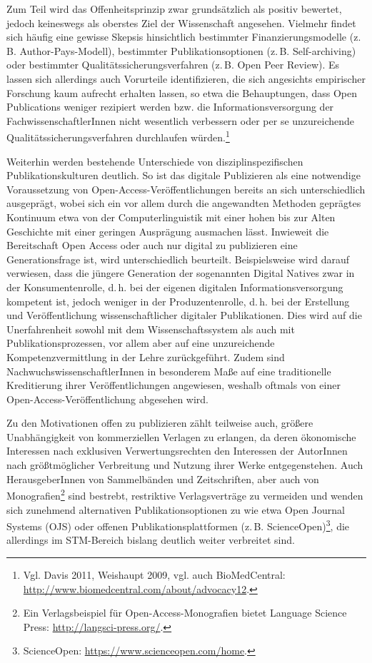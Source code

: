 \documentclass[a4paper,
fontsize=11pt,
oneside,
numbers=noperiodatend,
parskip=half-,
bibliography=totoc,
final
]{scrartcl}
\begin{document}
Zum Teil wird das Offenheitsprinzip zwar grundsätzlich als positiv
bewertet, jedoch keineswegs als oberstes Ziel der Wissenschaft
angesehen. Vielmehr findet sich häufig eine gewisse Skepsis hinsichtlich
bestimmter Finanzierungsmodelle (z.\,B. Author-Pays-Modell), bestimmter
Publikationsoptionen (z.\,B. Self-archiving) oder bestimmter
Qualitätssicherungsverfahren (z.\,B. Open Peer Review). Es lassen sich
allerdings auch Vorurteile identifizieren, die sich angesichts
empirischer Forschung kaum aufrecht erhalten lassen, so etwa die
Behauptungen, dass Open Publications weniger rezipiert werden bzw. die
Informationsversorgung der FachwissenschaftlerInnen nicht wesentlich
verbessern oder per se unzureichende Qualitätssicherungsverfahren
durchlaufen würden.\footnote{Vgl. Davis 2011, Weishaupt 2009, vgl. auch
  BioMedCentral: \url{http://www.biomedcentral.com/about/advocacy12}.}

Weiterhin werden bestehende Unterschiede von disziplinspezifischen
Publikationskulturen deutlich. So ist das digitale Publizieren als eine
notwendige Voraussetzung von Open-Access-Ver\-öffentlichungen bereits an
sich unterschiedlich ausgeprägt, wobei sich ein vor allem durch die
angewandten Methoden geprägtes Kontinuum etwa von der Computerlinguistik
mit einer hohen bis zur Alten Geschichte mit einer geringen Ausprägung
ausmachen lässt. Inwieweit die Bereitschaft Open Access oder auch nur
digital zu publizieren eine Generationsfrage ist, wird unterschiedlich
beurteilt. Beispielsweise wird darauf verwiesen, dass die jüngere
Generation der sogenannten Digital Natives zwar in der Konsumentenrolle,
d.\,h. bei der eigenen digitalen Informationsversorgung kompetent ist,
jedoch weniger in der Produzentenrolle, d.\,h. bei der Erstellung und
Veröffentlichung wissenschaftlicher digitaler Publikationen. Dies wird
auf die Unerfahrenheit sowohl mit dem Wissenschaftssystem als auch mit
Publikationsprozessen, vor allem aber auf eine unzureichende
Kompetenzvermittlung in der Lehre zurückgeführt. Zudem sind
NachwuchswissenschaftlerInnen in besonderem Maße auf eine traditionelle
Kreditierung ihrer Veröffentlichungen angewiesen, weshalb oftmals von
einer Open-Access-Veröffentlichung abgesehen wird.

Zu den Motivationen offen zu publizieren zählt teilweise auch, größere
Unabhängigkeit von kommerziellen Verlagen zu erlangen, da deren
ökonomische Interessen nach exklusiven Verwertungsrechten den Interessen
der AutorInnen nach größtmöglicher Verbreitung und Nutzung ihrer Werke
entgegenstehen. Auch HerausgeberInnen von Sammelbänden und
Zeitschriften, aber auch von Monografien\footnote{Ein Verlagsbeispiel
  für Open-Access-Monografien bietet Language Science Press:
  \url{http://langsci-press.org/}.} sind bestrebt, restriktive
Verlagsverträge zu vermeiden und wenden sich zunehmend alternativen
Publikationsoptionen zu wie etwa Open Journal Systems (OJS) oder offenen
Publikationsplattformen (z.\,B. ScienceOpen)\footnote{ScienceOpen:
  \url{https://www.scienceopen.com/home}.}, die allerdings im
STM-Bereich bislang deutlich weiter verbreitet sind.
\end{document}
